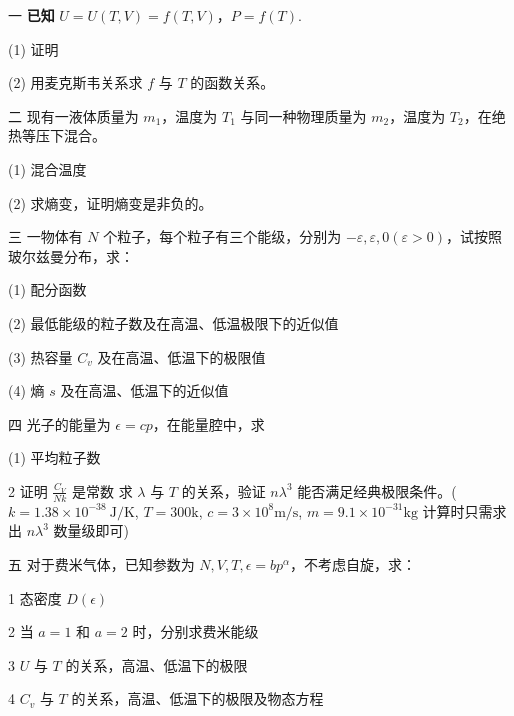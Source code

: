 一 \textbf{已知} $U = U(T, V) = f(T, V)$，$P = f(T)$.

(1) 证明

(2) 用麦克斯韦关系求 $f$ 与 $T$ 的函数关系。

二 现有一液体质量为 $m_1$，温度为 $T_1$ 与同一种物理质量为 $m_2$，温度为 $T_2$，在绝热等压下混合。

(1) 混合温度

(2) 求熵变，证明熵变是非负的。

三 一物体有 $N$ 个粒子，每个粒子有三个能级，分别为 $-\varepsilon, \varepsilon, 0 (\varepsilon > 0)$，试按照玻尔兹曼分布，求：

(1) 配分函数

(2) 最低能级的粒子数及在高温、低温极限下的近似值

(3) 热容量 $C_v$ 及在高温、低温下的极限值

(4) 熵 $s$ 及在高温、低温下的近似值

四 光子的能量为 $\epsilon = cp$，在能量腔中，求

(1) 平均粒子数

{2} 证明 $\frac{C_V}{Nk}$ 是常数
求 $\lambda$ 与 $T$ 的关系，验证 $n \lambda^3$ 能否满足经典极限条件。($k=1.38 \times 10^{-38} \ \text{J/K}$, $T=300 \text{k}$, $c=3 \times 10^8 \text{m/s}$, $m=9.1 \times 10^{-31} \text{kg}$ 计算时只需求出 $n \lambda^3$ 数量级即可)



五 对于费米气体，已知参数为 $N, V, T, \epsilon = b p^\alpha$，不考虑自旋，求：


{1} 态密度 $D(\epsilon)$

{2} 当 $a=1$ 和 $a=2$ 时，分别求费米能级

{3} $U$ 与 $T$ 的关系，高温、低温下的极限

{4} $C_v$ 与 $T$ 的关系，高温、低温下的极限及物态方程